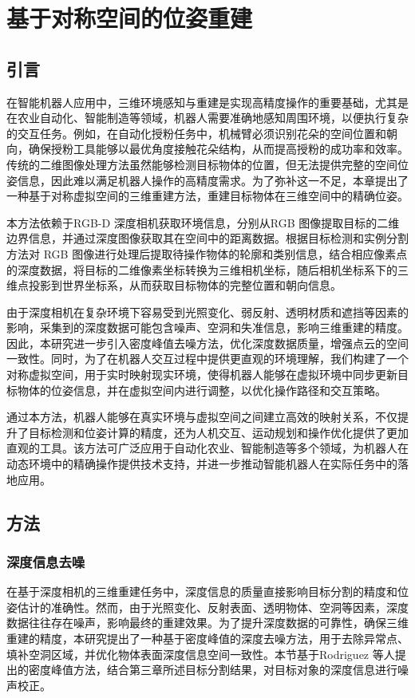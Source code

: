 
\chapter{基于对称空间的位姿重建}\label{ch:4}  \label{sec:rebuild}
\section{引言}
在智能机器人应用中，三维环境感知与重建是实现高精度操作的重要基础，尤其是在农业自动化、智能制造等领域，机器人需要准确地感知周围环境，以便执行复杂的交互任务。例如，在自动化授粉任务中，机械臂必须识别花朵的空间位置和朝向，确保授粉工具能够以最优角度接触花朵结构，从而提高授粉的成功率和效率。传统的二维图像处理方法虽然能够检测目标物体的位置，但无法提供完整的空间位姿信息，因此难以满足机器人操作的高精度需求。为了弥补这一不足，本章提出了一种基于对称虚拟空间的三维重建方法，重建目标物体在三维空间中的精确位姿。

本方法依赖于RGB-D 深度相机获取环境信息，分别从RGB 图像提取目标的二维边界信息，并通过深度图像获取其在空间中的距离数据。根据目标检测和实例分割方法对 RGB 图像进行处理后提取待操作物体的轮廓和类别信息，结合相应像素点的深度数据，将目标的二维像素坐标转换为三维相机坐标，随后相机坐标系下的三维点投影到世界坐标系，从而获取目标物体的完整位置和朝向信息。

由于深度相机在复杂环境下容易受到光照变化、弱反射、透明材质和遮挡等因素的影响，采集到的深度数据可能包含噪声、空洞和失准信息，影响三维重建的精度。因此，本研究进一步引入密度峰值去噪方法，优化深度数据质量，增强点云的空间一致性。同时，为了在机器人交互过程中提供更直观的环境理解，我们构建了一个对称虚拟空间，用于实时映射现实环境，使得机器人能够在虚拟环境中同步更新目标物体的位姿信息，并在虚拟空间内进行调整，以优化操作路径和交互策略。

通过本方法，机器人能够在真实环境与虚拟空间之间建立高效的映射关系，不仅提升了目标检测和位姿计算的精度，还为人机交互、运动规划和操作优化提供了更加直观的工具。该方法可广泛应用于自动化农业、智能制造等多个领域，为机器人在动态环境中的精确操作提供技术支持，并进一步推动智能机器人在实际任务中的落地应用。

\section{方法}

\subsection{深度信息去噪}
在基于深度相机的三维重建任务中，深度信息的质量直接影响目标分割的精度和位姿估计的准确性。然而，由于光照变化、反射表面、透明物体、空洞等因素，深度数据往往存在噪声，影响最终的重建效果。为了提升深度数据的可靠性，确保三维重建的精度，本研究提出了一种基于密度峰值的深度去噪方法，用于去除异常点、填补空洞区域，并优化物体表面深度信息空间一致性。本节基于Rodriguez 等人\cite{rodriguez2014clustering}提出的密度峰值方法，结合第三章所述目标分割结果，对目标对象的深度信息进行噪声校正。

